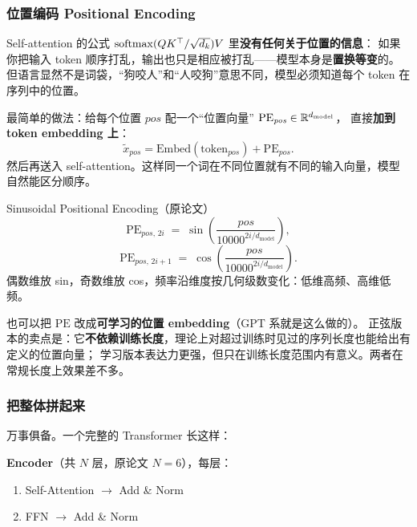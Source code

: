 \subsubsection{位置编码 Positional Encoding}

\begin{problemblock}
Self-attention 的公式 $\mathrm{softmax}(QK^\top/\sqrt{d_k})V$ 里\textbf{没有任何关于位置的信息}：
如果你把输入 token 顺序打乱，输出也只是相应被打乱——模型本身是\textbf{置换等变}的。
但语言显然不是词袋，``狗咬人''和``人咬狗''意思不同，模型必须知道每个 token 在序列中的位置。
\end{problemblock}

\begin{intuitionblock}
最简单的做法：给每个位置 $\mathit{pos}$ 配一个``位置向量'' $\mathrm{PE}_{\mathit{pos}} \in \mathbb{R}^{d_{\text{model}}}$，
直接\textbf{加到 token embedding 上}：
\[
  \tilde{x}_{\mathit{pos}} = \mathrm{Embed}(\text{token}_{\mathit{pos}}) + \mathrm{PE}_{\mathit{pos}} .
\]
然后再送入 self-attention。这样同一个词在不同位置就有不同的输入向量，模型自然能区分顺序。
\end{intuitionblock}

\begin{mathbox}{Sinusoidal Positional Encoding（原论文）}
\[
  \mathrm{PE}_{\mathit{pos},\, 2i}   \;=\; \sin\!\left(\frac{\mathit{pos}}{10000^{2i / d_{\text{model}}}}\right),
\]
\[
  \mathrm{PE}_{\mathit{pos},\, 2i+1} \;=\; \cos\!\left(\frac{\mathit{pos}}{10000^{2i / d_{\text{model}}}}\right).
\]
偶数维放 sin，奇数维放 cos，频率沿维度按几何级数变化：低维高频、高维低频。
\end{mathbox}

\begin{remark}[要不要学位置？]
也可以把 $\mathrm{PE}$ 改成\textbf{可学习的位置 embedding}（GPT 系就是这么做的）。
正弦版本的卖点是：它\textbf{不依赖训练长度}，理论上对超过训练时见过的序列长度也能给出有定义的位置向量；
学习版本表达力更强，但只在训练长度范围内有意义。两者在常规长度上效果差不多。
\end{remark}

\subsubsection{把整体拼起来}

万事俱备。一个完整的 Transformer 长这样：

\textbf{Encoder}（共 $N$ 层，原论文 $N=6$），每层：
\begin{enumerate}
  \item Self-Attention $\to$ Add \& Norm
  \item FFN $\to$ Add \& Norm
\end{enumerate}

